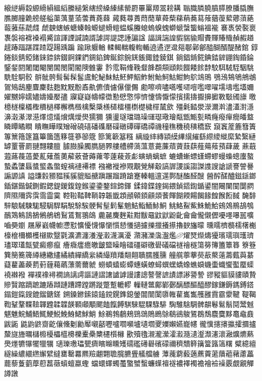 縗縌縟縠縓縎縜縕縚縢縋縏縖縍縔縥縤罃罻罼罺羱翯耪耩
聬膱膦膮膹膵膫膰膬膴膲膷膧臲艕艖艗蕖蕅蕫蕍蕓蕡蕘蕀
蕆蕤蕁蕢蕄蕑蕇蕣蔾蕛蕱蕎蕮蕵蕕蕧蕠薌蕦蕝蕔蕥蕬虣虥
虤螤螛螏螗螓螒螈螁螖螘蝹螇螣螅螐螑螝螄螔螜螚螉褞褦
褰褭褮褧褱褢褩褣褯褬褟觱諠諢諲諴諵諝謔諤諟諰諈諞諡
諨諿諯諻貑貒貐賵賮賱賰賳赬赮趥趧踳踾踸蹀蹅踶踼踽蹁
踰踿躽輶輮輵輲輹輷輴遶遹遻邆郺鄳鄵鄶醓醐醑醍醏錧
錞錈錟錆錏鍺錸錼錛錣錒錁鍆錭錎錍鋋錝鋺錓鋹鋷錴錂錤
鋿錩錹錵錪錔錌錋鋾錉錀鋻錖閼闍閾閹閺閶閿閵閽隩雔霋
霒霐鞙鞗鞔韰韸頵頯頲餤餟餧餩馞駮駬駥駤駰駣駪駩駧骹
骿骴骻髶髺髹髷鬳鮀鮅鮇魼魾魻鮂鮓鮒鮐魺鮕魽鮈鴥鴗鴠
鴞鴔鴩鴝鴘鴢鴐鴙鴟麈麆麇麮麭黕黖黺鼒鼽儦儥儢儤儠儩
勴嚓嚌嚍嚆嚄嚃噾嚂噿嚁壖壔壏壒嬭嬥嬲嬣嬬嬧嬦嬯嬮孻
寱寲嶷幬幪徾懃憵憼懧懠懥懤懨懞擯擩擣擫擤擨斁斀斶旚
曒檍檖檁檥檉檟檛檡檞檇檓檎檕檃檨檤檑橿檦檚檅檌檒歛
殭氉濌澩濴濔濣濜濭濧濦濞濲濝濢濨燡燱燨燲燤燰燢獳獮
獯璗璲璫璐璪璭璱璥璯甐甑甒甏疄癃癈癉癇皤盩瞵瞫瞲瞷
瞶瞴瞱瞨矰磳磽礂磻磼磿磲礅磹磾礄禫禨穜穛穖穘穔穚窾
竀竁簅簏篲簀篿篻簎篴簋篳簂簉簃簁篸篽簆篰篱簐簊糨
縭縼繂縳顈縸縪繉繀繇縩繌縰縻縶繄縺罅罿罾罽翴翲耬膻
臄臌臊臅臇膼臩艛艚艜薃薀薏薧薕薠薋薣蕻薤薚薞蕷蕼薉
薡蕺蕸蕗薎薖薆薍薙薝薁薢薂薈薅蕹蕶薘薐薟虨螾螪螭蟅
螰螬螹螵螼螮蟉蟃蟂蟌螷螯蟄蟊螴螶螿螸螽蟞螲褵褳褼褾
襁襒褷襂覭覯覮觲觳謞謘謖謑謅謋謢謏謒謕謇謍謈謆謜謓
謚豏豰豲豱豯貕貔賹赯蹎蹍蹓蹐蹌蹇轃轀邅遾鄸醚醢醛醙
醟醡醝醠鎡鎃鎯鍤鍖鍇鍼鍘鍜鍶鍉鍐鍑鍠鍭鎏鍌鍪鍹鍗鍕
鍒鍏鍱鍷鍻鍡鍞鍣鍧鍎鍙闇闀闉闃闅閷隮隰隬霠霟霘霝霙
鞚鞡鞜鞞鞝韕韔韱顁顄顊顉顅顃餥餫餬餪餳餲餯餭餱餰馘
馣馡騂駺駴駷駹駸駶駻駽駾駼騃骾髾髽鬁髼魈鮚鮨鮞鮛鮦
鮡鮥鮤鮆鮢鮠鮯鴳鵁鵧鴶鴮鴯鴱鴸鴰鵅鵂鵃鴾鴷鵀鴽翵鴭
麊麉麍麰黈黚黻黿鼤鼣鼢齔⿕龠儱儭儮嚘嚜嚗嚚嚝嚙奰嬼
屩屪巀幭幮懘懟懭懮懱懪懰懫懖懩擿攄擽擸攁攃擼斔旛曚
曛曘櫅檹檽櫡櫆檺檶檷櫇檴檭歞毉氋瀇瀌瀍瀁瀅瀔瀎濿瀀
濻瀦濼濷瀊爁燿燹爃燽獶璸瓀璵瓁璾璶璻瓂甔甓癜癤癙
癐癓癗癚皦皽盬矂瞺礌礓礔礉礐礒礑禭禬穟簜簩簙簠簟簭
簝簦簨簢簥簰繜繐繖繣繘繢繟繑繠繗繓羵羳翷翸聵臑臒臐
艟艞薴藆藀藃藂薳薵薽藇藄薿藋藎藈藅薱薶藒蘤薸薷薾虩
蟧蟦蟢蟛蟫蟪蟥蟟蟳蟤蟔蟜蟓蟭蟘蟣蟗蟙蠁蟴蟨蟝襓襋襏
襌襆襐襑襉謪謧謣謳謰謵譇謯謼謾謱謥謷謦謶謮謤謻謽謺
豂豵貙貘貗賾贄贂贀蹜蹢蹠蹗蹖蹞蹥蹧蹛蹚蹡蹝蹩蹔轆轇
轈轋鄨鄺鄻鄾醨醥醧醯醪鎵鎌鎒鎷鎛鎝鎉鎧鎎鎪鎞鎦鎕鎈
鎙鎟鎀鎍鎱鎑鎲鎤鎨鎴鎣闒闓闑隳雗雚巂雟雘雝霣霢霥鞬
鞮鞨鞫鞤鞪鞢鞥韗韙韖韘韺顐顑顒颸饁餼餺騏騋騉騍騄騑
騊騅騇騆髀髜鬈鬄鬅鬩鬵魊魌魋鯇鯆鯃鮿鯁鮵鮸鯓鮶鯄鮹
鮽鵜鵓鵏鵊鵛鵋鵙鵖鵌鵗鵒鵔鵟鵘鵚麎麌黟鼁鼀鼖鼥鼫
鼪鼩鼨齌齕儴儵劖勷厴嚫嚭嚦嚧嚪嚬壚壝壛夒嬽嬾嬿巃幰
徿懻攇攐攍攉攌攎斄旞旝曞櫧櫠櫌櫑櫙櫋櫟櫜櫐櫫櫏櫍櫞
歠殰氌瀙瀧瀠瀖瀫瀡瀢瀣瀩瀗瀤瀜爌爊爇爂爅犥犦犤犣犡
瓋瓅璷瓃甖癠矉矊矄矱礝礛礡礜礗礞禰穧穨簳簼簹簬簻糬
糪繶繵繸繰繷繯繺繲繴繨罋罊羃羆羷翽翾聸臗臕舋艤艡艣
藫藱藭藙藡藨藚藗藬藲藸藘藟藣藜藑藰藦藯藞藢蠀蟺蠃蟶
蟷蠉蠌蠋蠆蟼蠈蟿蠊蠂襢襚襛襗襡襜襘襝襙覈覷覶觶譐譈
